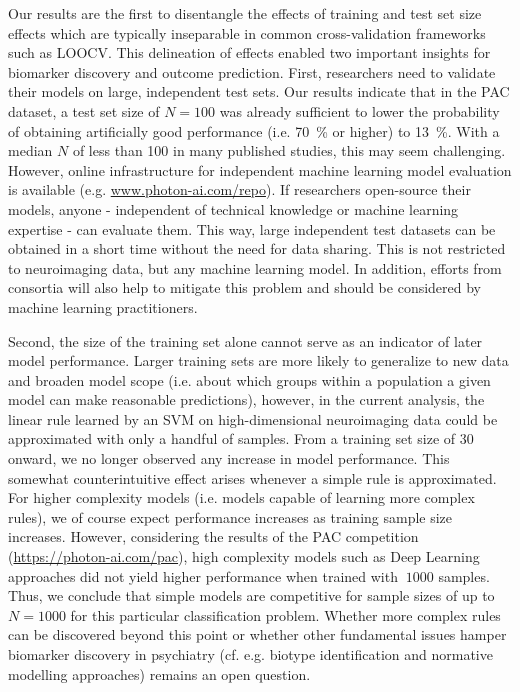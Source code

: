 \documentclass{article}
\begin{document}
    Our results are the first to disentangle the effects of training and test set size effects which are typically inseparable in common cross-validation frameworks such as LOOCV. This delineation of effects enabled two important insights for biomarker discovery and outcome prediction. First, researchers need to validate their models on large, independent test sets. Our results indicate that in the PAC dataset, a test set size of $N=100$ was already sufficient to lower the probability of obtaining artificially good performance (i.e. \SI{70}{\percent} or higher) to \SI{13}{\percent}. With a median $N$ of less than \num{100} in many published studies\cite{Arbabshirani2017}, this may seem challenging. However, online infrastructure for independent machine learning model evaluation is available (e.g. \url{www.photon-ai.com/repo}). If researchers open-source their models, anyone - independent of technical knowledge or machine learning expertise - can evaluate them. This way, large independent test datasets can be obtained in a short time without the need for data sharing. This is not restricted to neuroimaging data, but any machine learning model. In addition, efforts from consortia will also help to mitigate this problem and should be considered by machine learning practitioners.

    Second, the size of the training set alone cannot serve as an indicator of later model performance. Larger training sets are more likely to generalize to new data and broaden model scope (i.e. about which groups within a population a given model can make reasonable predictions), however, in the current analysis, the linear rule learned by an SVM on high-dimensional neuroimaging data could be approximated with only a handful of samples. From a training set size of \num{30} onward, we no longer observed any increase in model performance. This somewhat counterintuitive effect arises whenever a simple rule is approximated. For higher complexity models (i.e. models capable of learning more complex rules), we of course expect performance increases as training sample size increases. However, considering the results of the PAC competition (\url{https://photon-ai.com/pac}), high complexity models such as Deep Learning approaches did not yield higher performance when trained with $~\num{1000}$ samples. Thus, we conclude that simple models are competitive for sample sizes of up to $N=\num{1000}$ for this particular classification problem. Whether more complex rules can be discovered beyond this point or whether other fundamental issues hamper biomarker discovery in psychiatry (cf. e.g. biotype identification\cite{Kircher2018} and normative modelling approaches\cite{Marquand2016}) remains an open question.
\end{document}
